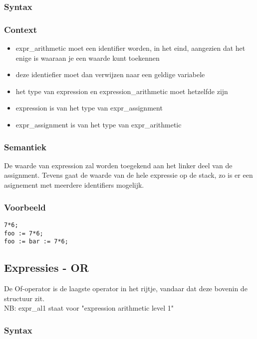 \documentclass[]{article}
\begin{document}
\subsubsection{Syntax}

\subsubsection{Context}
\begin{itemize}
\item expr\_arithmetic moet een identifier worden, in het eind, aangezien dat het enige is waaraan je een waarde kunt toekennen
\item deze identiefier moet dan verwijzen naar een geldige variabele
\item het type van expression en expression\_arithmetic moet hetzelfde zijn
\item expression is van het type van expr\_assignment
\item expr\_assignment is van het type van expr\_arithmetic 
\end{itemize}
\subsubsection{Semantiek}
De waarde van expression zal worden toegekend aan het linker deel van de assignment.
Tevens gaat de waarde van de hele expressie op de stack, zo is er een asignement met meerdere identifiers mogelijk.
\subsubsection{Voorbeeld}
\begin{lstlisting}[style=SELMA]
7*6;
foo := 7*6;
foo := bar := 7*6;
\end{lstlisting}

\subsection{Expressies - OR}
De Of-operator is de laagste operator in het rijtje, vandaar dat deze bovenin de structuur zit.
\\
NB: expr\_al1 staat voor "expression arithmetic level 1"
\subsubsection{Syntax}

\end{document}
